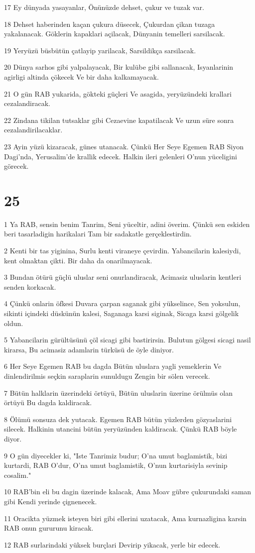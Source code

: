 \par 17 Ey dünyada yasayanlar, Önünüzde dehset, çukur ve tuzak var.
\par 18 Dehset haberinden kaçan çukura düsecek, Çukurdan çikan tuzaga yakalanacak. Göklerin kapaklari açilacak, Dünyanin temelleri sarsilacak.
\par 19 Yeryüzü büsbütün çatlayip yarilacak, Sarsildikça sarsilacak.
\par 20 Dünya sarhos gibi yalpalayacak, Bir kulübe gibi sallanacak, Isyanlarinin agirligi altinda çökecek Ve bir daha kalkamayacak.
\par 21 O gün RAB yukarida, gökteki güçleri Ve asagida, yeryüzündeki krallari cezalandiracak.
\par 22 Zindana tikilan tutsaklar gibi Cezaevine kapatilacak Ve uzun süre sonra cezalandirilacaklar.
\par 23 Ayin yüzü kizaracak, günes utanacak. Çünkü Her Seye Egemen RAB Siyon Dagi'nda, Yerusalim'de krallik edecek. Halkin ileri gelenleri O'nun yüceligini görecek.

\chapter{25}

\par 1 Ya RAB, sensin benim Tanrim, Seni yüceltir, adini överim. Çünkü sen eskiden beri tasarladigin harikalari Tam bir sadakatle gerçeklestirdin.
\par 2 Kenti bir tas yiginina, Surlu kenti viraneye çevirdin. Yabancilarin kalesiydi, kent olmaktan çikti. Bir daha da onarilmayacak.
\par 3 Bundan ötürü güçlü uluslar seni onurlandiracak, Acimasiz uluslarin kentleri senden korkacak.
\par 4 Çünkü onlarin öfkesi Duvara çarpan saganak gibi yükselince, Sen yoksulun, sikinti içindeki düskünün kalesi, Saganaga karsi siginak, Sicaga karsi gölgelik oldun.
\par 5 Yabancilarin gürültüsünü çöl sicagi gibi bastirirsin. Bulutun gölgesi sicagi nasil kirarsa, Bu acimasiz adamlarin türküsü de öyle diniyor.
\par 6 Her Seye Egemen RAB bu dagda Bütün uluslara yagli yemeklerin Ve dinlendirilmis seçkin saraplarin sunuldugu Zengin bir sölen verecek.
\par 7 Bütün halklarin üzerindeki örtüyü, Bütün uluslarin üzerine örülmüs olan örtüyü Bu dagda kaldiracak.
\par 8 Ölümü sonsuza dek yutacak. Egemen RAB bütün yüzlerden gözyaslarini silecek. Halkinin utancini bütün yeryüzünden kaldiracak. Çünkü RAB böyle diyor.
\par 9 O gün diyecekler ki, "Iste Tanrimiz budur; O'na umut baglamistik, bizi kurtardi, RAB O'dur, O'na umut baglamistik, O'nun kurtarisiyla sevinip cosalim."
\par 10 RAB'bin eli bu dagin üzerinde kalacak, Ama Moav gübre çukurundaki saman gibi Kendi yerinde çignenecek.
\par 11 Oracikta yüzmek isteyen biri gibi ellerini uzatacak, Ama kurnazligina karsin RAB onun gururunu kiracak.
\par 12 RAB surlarindaki yüksek burçlari Devirip yikacak, yerle bir edecek.

